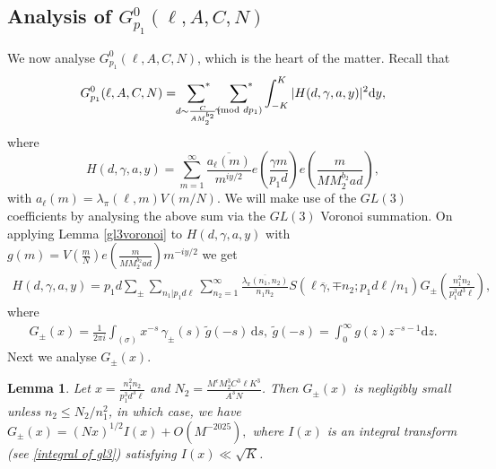\documentclass[12pt,a4paper,twoside, reqno]{amsart}
\newcommand{\shortmod}{\ensuremath{\negthickspace \negthickspace \negthickspace \pmod}}
\newcommand{\sumstar}{\sideset{}{^*}\sum}
\newtheorem{lemma}{Lemma}
\begin{document}
\subsection{Analysis of $ G_{p_1}^0(\ell, A,C,N)$}
We now analyse $ G_{p_1}^0(\ell, A,C,N)$, which is the heart of the matter. 
Recall that 
\begin{align}\label{pre voronoi}
     G_{p_1}^0(\ell, A,C,N) =  \mathop{\sumstar_{ \substack{d \sim \frac{C}{A M_2^{b_2}}
       } } }   \sumstar_{\substack{ \gamma \shortmod{dp_1} }  } \int_{-K}^K | H(d, \gamma,a,y)  |^2 \mathrm{d}y,
\end{align}
where
\[ H(d, \gamma,a,y)= \sum_{m=1}^\infty  \frac{ \overline{a_\ell(m )}}{m^{ iy/2}}    e\left(\frac{ \gamma m }{p_1d} \right)  e\left(\frac{m }{MM_2^{b_2}ad} \right),\]
with $a_\ell(m)=\lambda_\pi (\ell, m)V(m/N)$. 
We will make use of the $GL(3)$ coefficients by analysing the above sum via the $GL(3)$ Voronoi summation. 
On applying Lemma \ref{gl3voronoi} to $H(d, \gamma,a,y) $ with $g(m)=V\left( \frac{m}{N}\right) e\left(\frac{m }{MM_2^{b_2}ad} \right)m^{-iy/2}$ we get 
\begin{align}\label{after gl3 voronoi}
    H(d, \gamma,a,y)=p_1d \sum_{\pm} \sum_{n_1|p_1d\ell} \sum_{n_2=1}^\infty \frac{\overline{\lambda_\pi(n_1,n_2)}}{n_1n_2}S(\ell \overline{\gamma}, \mp n_2;p_1d\ell /n_1 )G_{\pm} \left( \frac{n_1^2n_2}{p_1^3d^3 \ell}\right),
\end{align}
where 
\begin{align*}
G_{\pm}(x) = \frac{1}{2 \pi i} \int_{(\sigma)} x^{-s} \, \gamma_{\pm}(s) \, \widetilde{g}(-s) \, \mathrm{d}s, \  \widetilde{g}(-s)= \int_0^\infty g(z) z^{-s-1} \mathrm{d}z.
\end{align*}
Next we analyse $G_\pm (x)$. 
\begin{lemma}\label{voronoi lemma}
	 Let $x=\frac{n_1^2n_2}{ p_1^3d^3\ell}$ and $N_2=\frac{M^\epsilon M_2^3 C^3\ell K^3 }{ A^3N}$.  Then 
	$G_{\pm}(x)$ is negligibly small unless  $n_2 \leq  N_{2}/n_1^2$, in  which  case, we have $G_{\pm} \left(x\right) = \left( Nx\right)^{1/2} I{(x)}+O(M^{-2025}) ,$ where $I(x)$ is an integral transform (see \eqref{integral of gl3})  satisfying $I(x) \ll \sqrt{K}$.
\end{lemma}
\end{document}
